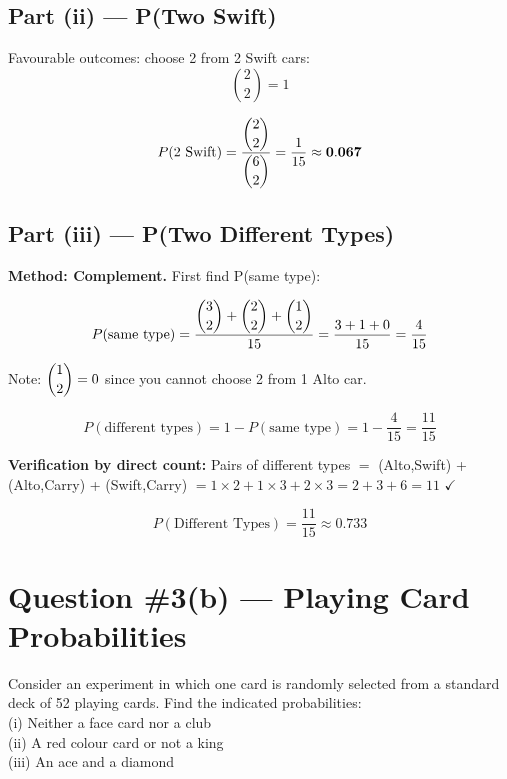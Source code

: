 \documentclass[12pt]{article}
\begin{document}
\subsection*{Part (ii) --- P(Two Swift)}

Favourable outcomes: choose 2 from 2 Swift cars:
\[
  \binom{2}{2} = 1
\]

\begin{answerbox}
\[
  P(\text{2 Swift}) = \frac{\dbinom{2}{2}}{\dbinom{6}{2}} = \frac{1}{15} \approx \mathbf{0.067}
\]
\end{answerbox}

\subsection*{Part (iii) --- P(Two Different Types)}

\textbf{Method: Complement.} First find P(same type):

\[
  P(\text{same type}) = \frac{\dbinom{3}{2} + \dbinom{2}{2} + \dbinom{1}{2}}{15}
  = \frac{3 + 1 + 0}{15} = \frac{4}{15}
\]

Note: $\dbinom{1}{2} = 0$ since you cannot choose 2 from 1 Alto car.

\[
  P(\text{different types}) = 1 - P(\text{same type}) = 1 - \frac{4}{15} = \frac{11}{15}
\]

\textbf{Verification by direct count:} Pairs of different types $=$ (Alto,Swift) + (Alto,Carry) + (Swift,Carry)
$= 1\!\times\!2 + 1\!\times\!3 + 2\!\times\!3 = 2+3+6 = 11$ \quad $\checkmark$

\begin{answerbox}
\[
  P(\text{Different Types}) = \frac{11}{15} \approx \mathbf{0.733}
\]
\end{answerbox}

\newpage

\section{Question \#3(b) --- Playing Card Probabilities}

\begin{problembox}
Consider an experiment in which one card is randomly selected from a standard deck of 52 playing cards. Find the indicated probabilities:\\
(i)   Neither a face card nor a club\\
(ii)  A red colour card or not a king\\
(iii) An ace and a diamond
\end{problembox}
\end{document}
